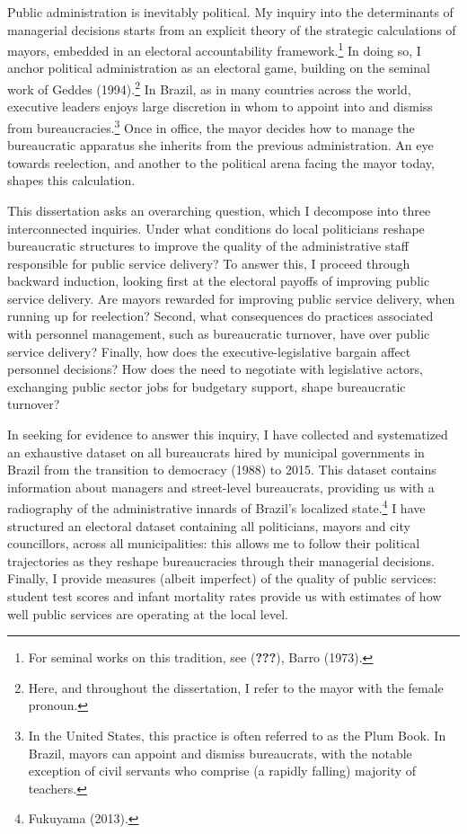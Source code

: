 \documentclass[12pt,]{article}
\let\rmarkdownfootnote\footnote%
\def\footnote{\protect\rmarkdownfootnote}
\begin{document}
Public administration is inevitably political. My inquiry into the
determinants of managerial decisions starts from an explicit theory of
the strategic calculations of mayors, embedded in an electoral
accountability framework.\footnote{For seminal works on this tradition,
  see ({\textbf{???}}), Barro (1973).} In doing so, I anchor political
administration as an electoral game, building on the seminal work of
Geddes (1994).\footnote{Here, and throughout the dissertation, I refer
  to the mayor with the female pronoun.} In Brazil, as in many countries
across the world, executive leaders enjoys large discretion in whom to
appoint into and dismiss from bureaucracies.\footnote{In the United
  States, this practice is often referred to as the Plum Book. In
  Brazil, mayors can appoint and dismiss bureaucrats, with the notable
  exception of civil servants who comprise (a rapidly falling) majority
  of teachers.} Once in office, the mayor decides how to manage the
bureaucratic apparatus she inherits from the previous administration. An
eye towards reelection, and another to the political arena facing the
mayor today, shapes this calculation.

This dissertation asks an overarching question, which I decompose into
three interconnected inquiries. Under what conditions do local
politicians reshape bureaucratic structures to improve the quality of
the administrative staff responsible for public service delivery? To
answer this, I proceed through backward induction, looking first at the
electoral payoffs of improving public service delivery. Are mayors
rewarded for improving public service delivery, when running up for
reelection? Second, what consequences do practices associated with
personnel management, such as bureaucratic turnover, have over public
service delivery? Finally, how does the executive-legislative bargain
affect personnel decisions? How does the need to negotiate with
legislative actors, exchanging public sector jobs for budgetary support,
shape bureaucratic turnover?

In seeking for evidence to answer this inquiry, I have collected and
systematized an exhaustive dataset on all bureaucrats hired by municipal
governments in Brazil from the transition to democracy (1988) to 2015.
This dataset contains information about managers and street-level
bureaucrats, providing us with a radiography of the administrative
innards of Brazil's localized state.\footnote{Fukuyama (2013).} I have
structured an electoral dataset containing all politicians, mayors and
city councillors, across all municipalities: this allows me to follow
their political trajectories as they reshape bureaucracies through their
managerial decisions. Finally, I provide measures (albeit imperfect) of
the quality of public services: student test scores and infant mortality
rates provide us with estimates of how well public services are
operating at the local level.
\end{document}
